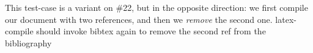 \documentclass{article}
\begin{document}
This test-case is a variant on \#22, but in the opposite direction: we
first  compile  our   document  with  two  references,   and  then  we
\emph{remove} the second one. latex-compile should invoke bibtex again
to remove the second ref from the bibliography
\bigskip

\cite{key1}
\cite{key2} 



\end{document}
